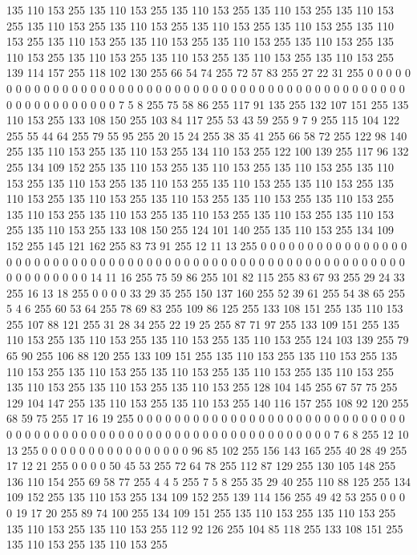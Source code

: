 135 110 153 255 135 110 153 255 135 110 153 255 135 110 153 255 135 110 153 255 135 110 153 255 135 110 153 255 135 110 153 255 135 110 153 255 135 110 153 255 135 110 153 255 135 110 153 255 135 110 153 255 135 110 153 255 135 110 153 255 135 110 153 255
135 110 153 255 135 110 153 255 135 110 153 255 139 114 157 255 118 102 130 255 66 54 74 255 72 57 83 255 27 22 31 255 0 0 0 0 0 0 0 0 0 0 0 0 0 0 0 0 0 0 0 0 0 0 0 0 0 0 0 0 0 0 0 0
0 0 0 0 0 0 0 0 0 0 0 0 0 0 0 0 0 0 0 0 0 0 0 0 0 0 0 0 7 5 8 255 75 58 86 255 117 91 135 255 132 107 151 255 135 110 153 255 133 108 150 255 103 84 117 255 53 43 59 255 9 7 9 255
115 104 122 255 55 44 64 255 79 55 95 255 20 15 24 255 38 35 41 255 66 58 72 255 122 98 140 255 135 110 153 255 135 110 153 255 134 110 153 255 122 100 139 255 117 96 132 255 134 109 152 255 135 110 153 255 135 110 153 255 135 110 153 255
135 110 153 255 135 110 153 255 135 110 153 255 135 110 153 255 135 110 153 255 135 110 153 255 135 110 153 255 135 110 153 255 135 110 153 255 135 110 153 255 135 110 153 255 135 110 153 255 135 110 153 255 135 110 153 255 135 110 153 255 135 110 153 255
133 108 150 255 124 101 140 255 135 110 153 255 134 109 152 255 145 121 162 255 83 73 91 255 12 11 13 255 0 0 0 0 0 0 0 0 0 0 0 0 0 0 0 0 0 0 0 0 0 0 0 0 0 0 0 0 0 0 0 0 0 0 0 0
0 0 0 0 0 0 0 0 0 0 0 0 0 0 0 0 0 0 0 0 0 0 0 0 0 0 0 0 0 0 0 0 14 11 16 255 75 59 86 255 101 82 115 255 83 67 93 255 29 24 33 255 16 13 18 255 0 0 0 0 33 29 35 255
150 137 160 255 52 39 61 255 54 38 65 255 5 4 6 255 60 53 64 255 78 69 83 255 109 86 125 255 133 108 151 255 135 110 153 255 107 88 121 255 31 28 34 255 22 19 25 255 87 71 97 255 133 109 151 255 135 110 153 255 135 110 153 255
135 110 153 255 135 110 153 255 124 103 139 255 79 65 90 255 106 88 120 255 133 109 151 255 135 110 153 255 135 110 153 255 135 110 153 255 135 110 153 255 135 110 153 255 135 110 153 255 135 110 153 255 135 110 153 255 135 110 153 255 135 110 153 255
128 104 145 255 67 57 75 255 129 104 147 255 135 110 153 255 135 110 153 255 140 116 157 255 108 92 120 255 68 59 75 255 17 16 19 255 0 0 0 0 0 0 0 0 0 0 0 0 0 0 0 0 0 0 0 0 0 0 0 0 0 0 0 0
0 0 0 0 0 0 0 0 0 0 0 0 0 0 0 0 0 0 0 0 0 0 0 0 0 0 0 0 0 0 0 0 0 0 0 0 7 6 8 255 12 10 13 255 0 0 0 0 0 0 0 0 0 0 0 0 0 0 0 0 96 85 102 255
156 143 165 255 40 28 49 255 17 12 21 255 0 0 0 0 50 45 53 255 72 64 78 255 112 87 129 255 130 105 148 255 136 110 154 255 69 58 77 255 4 4 5 255 7 5 8 255 35 29 40 255 110 88 125 255 134 109 152 255 135 110 153 255
134 109 152 255 139 114 156 255 49 42 53 255 0 0 0 0 19 17 20 255 89 74 100 255 134 109 151 255 135 110 153 255 135 110 153 255 135 110 153 255 135 110 153 255 112 92 126 255 104 85 118 255 133 108 151 255 135 110 153 255 135 110 153 255
